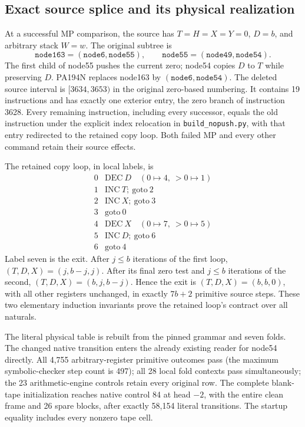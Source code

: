 \subsection{Exact source splice and its physical realization}

At a successful MP comparison, the source has $T=H=X=Y=0$, $D=b$, and
arbitrary stack $W=w$. The original subtree is
\[
 \texttt{node163}=(\texttt{node6},\texttt{node55}),\qquad
 \texttt{node55}=(\texttt{node49},\texttt{node54}).
\]
The first child of node55 pushes the current zero; node54 copies $D$ to
$T$ while preserving $D$. PA194N replaces node163 by
$(\texttt{node6},\texttt{node54})$.
The deleted source interval is $[3634,3653)$ in the original zero-based
numbering. It contains 19 instructions and has exactly one exterior
entry, the zero branch of instruction 3628. Every remaining instruction,
including every successor, equals the old instruction under the explicit
index relocation in \texttt{build\_nopush.py}, with that entry redirected
to the retained copy loop. Both failed MP and every other command retain
their source effects.

The retained copy loop, in local labels, is
\[
\begin{array}{c|l}
0&\mathrm{DEC}\ D\quad(0\mapsto4,\ >0\mapsto1)\\
1&\mathrm{INC}\ T;\ \mathrm{goto}\ 2\\
2&\mathrm{INC}\ X;\ \mathrm{goto}\ 3\\
3&\mathrm{goto}\ 0\\
4&\mathrm{DEC}\ X\quad(0\mapsto7,\ >0\mapsto5)\\
5&\mathrm{INC}\ D;\ \mathrm{goto}\ 6\\
6&\mathrm{goto}\ 4
\end{array}
\]
Label seven is the exit. After $j\le b$ iterations of the first loop,
$(T,D,X)=(j,b-j,j)$. After its final zero test and $j\le b$ iterations
of the second, $(T,D,X)=(b,j,b-j)$. Hence the exit is
$(T,D,X)=(b,b,0)$, with all other registers unchanged, in exactly
$7b+2$ primitive source steps. These two elementary induction invariants
prove the retained loop's contract over all naturals.

The literal physical table is rebuilt from the pinned grammar and seven
folds. The changed native transition enters the already existing reader
for node54 directly. All 4,755 arbitrary-register primitive outcomes pass
(the maximum symbolic-checker step count is 497); all 28 local fold
contexts pass simultaneously; the 23 arithmetic-engine controls retain
every original row. The complete blank-tape initialization reaches native
control 84 at head $-2$, with the entire clean frame and 26 spare blocks,
after exactly 58,154 literal transitions. The startup equality includes
every nonzero tape cell.

